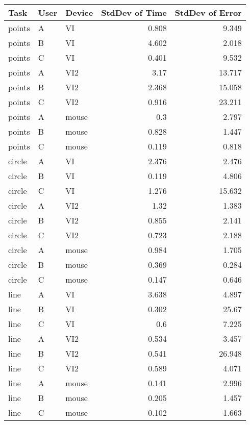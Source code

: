\begin{tabular}{lllrr}
 \toprule
 Task & User & Device & StdDev of Time & StdDev of Error \\
 \midrule
points  & A &  VI    & 0.808 & 9.349\\
points  & B &  VI    & 4.602 & 2.018\\
points  & C &  VI    & 0.401 & 9.532\\
points  & A &  VI2   & 3.17  & 13.717\\
points  & B &  VI2   & 2.368 & 15.058\\
points  & C &  VI2   & 0.916 & 23.211\\
points  & A &  mouse & 0.3   & 2.797\\
points  & B &  mouse & 0.828 & 1.447\\
points  & C &  mouse & 0.119 & 0.818\\
circle  & A &  VI    & 2.376 & 2.476\\
circle  & B &  VI    & 0.119 & 4.806\\
circle  & C &  VI    & 1.276 & 15.632\\
circle  & A &  VI2   & 1.32  & 1.383\\
circle  & B &  VI2   & 0.855 & 2.141\\
circle  & C &  VI2   & 0.723 & 2.188\\
circle  & A &  mouse & 0.984 & 1.705\\
circle  & B &  mouse & 0.369 & 0.284\\
circle  & C &  mouse & 0.147 & 0.646\\
line    & A &  VI    & 3.638 & 4.897\\
line    & B &  VI    & 0.302 & 25.67\\
line    & C &  VI    & 0.6   & 7.225\\
line    & A &  VI2   & 0.534 & 3.457\\
line    & B &  VI2   & 0.541 & 26.948\\
line    & C &  VI2   & 0.589 & 4.071\\
line    & A &  mouse & 0.141 & 2.996\\
line    & B &  mouse & 0.205 & 1.457\\
line    & C &  mouse & 0.102 & 1.663\\
 \bottomrule
\end{tabular}

